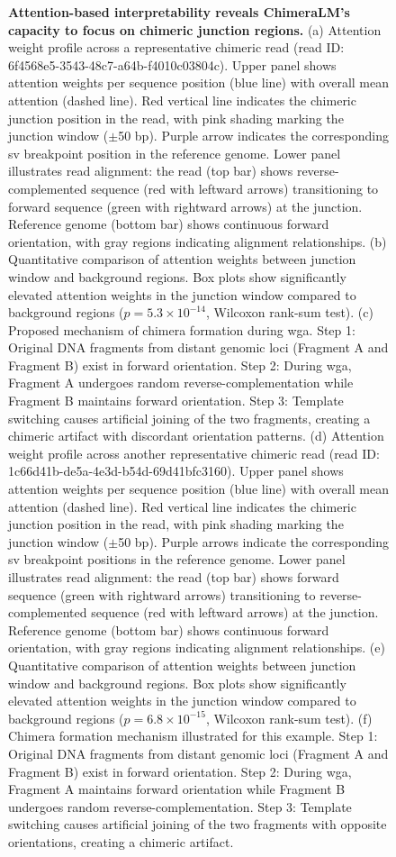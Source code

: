 \documentclass[pdflatex,sn-nature]{sn-jnl}%
\theoremstyle{thmstyleone}%
\theoremstyle{thmstyletwo}%
\theoremstyle{thmstylethree}%
\begin{document}
\begin{figure}[!ht]
	\caption{{\bf Attention-based interpretability reveals ChimeraLM's capacity to focus on chimeric junction regions.}
		(a) Attention weight profile across a representative chimeric read (read ID: 6f4568e5-3543-48c7-a64b-f4010c03804c). Upper panel shows attention weights per sequence position (blue line) with overall mean attention (dashed line). Red vertical line indicates the chimeric junction position in the read, with pink shading marking the junction window ($\pm$50 bp). Purple arrow indicates the corresponding \gls{sv} breakpoint position in the reference genome. Lower panel illustrates read alignment: the read (top bar) shows reverse-complemented sequence (red with leftward arrows) transitioning to forward sequence (green with rightward arrows) at the junction. Reference genome (bottom bar) shows continuous forward orientation, with gray regions indicating alignment relationships.
		(b) Quantitative comparison of attention weights between junction window and background regions. Box plots show significantly elevated attention weights in the junction window compared to background regions ($p = 5.3 \times 10^{-14}$, Wilcoxon rank-sum test).
		(c) Proposed mechanism of chimera formation during \gls{wga}. Step 1: Original DNA fragments from distant genomic loci (Fragment A and Fragment B) exist in forward orientation. Step 2: During \gls{wga}, Fragment A undergoes random reverse-complementation while Fragment B maintains forward orientation. Step 3: Template switching causes artificial joining of the two fragments, creating a chimeric artifact with discordant orientation patterns.
        (d) Attention weight profile across another representative chimeric read (read ID: 1c66d41b-de5a-4e3d-b54d-69d41bfc3160). Upper panel shows attention weights per sequence position (blue line) with overall mean attention (dashed line). Red vertical line indicates the chimeric junction position in the read, with pink shading marking the junction window ($\pm$50 bp). Purple arrows indicate the corresponding \gls{sv} breakpoint positions in the reference genome. Lower panel illustrates read alignment: the read (top bar) shows forward sequence (green with rightward arrows) transitioning to reverse-complemented sequence (red with leftward arrows) at the junction. Reference genome (bottom bar) shows continuous forward orientation, with gray regions indicating alignment relationships.
		(e) Quantitative comparison of attention weights between junction window and background regions. Box plots show significantly elevated attention weights in the junction window compared to background regions ($p = 6.8 \times 10^{-15}$, Wilcoxon rank-sum test).
		(f) Chimera formation mechanism illustrated for this example. Step 1: Original DNA fragments from distant genomic loci (Fragment A and Fragment B) exist in forward orientation. Step 2: During \gls{wga}, Fragment A maintains forward orientation while Fragment B undergoes random reverse-complementation. Step 3: Template switching causes artificial joining of the two fragments with opposite orientations, creating a chimeric artifact.}\label{fig:figure4}
\end{figure}
\end{document}

